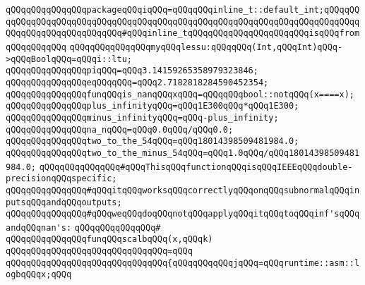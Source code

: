 \newline
\verb|qQQqqQQqqQQqqQQqpackageqQQqiqQQq=qQQqqQQqinline_t::default_int;qQQqqQQqqQQqqQQqqQQqqQQqqQQqqQQqqQQqqQQqqQQqqQQqqQQqqQQqqQQqqQQqqQQqqQQqqQQqqQQqqQQqqQQqqQQqqQQqqQQq#qQQqinline_tqQQqqQQqqQQqqQQqqQQqqQQqisqQQqfromqQQqqQQqqQQq|\newline
\newline
\verb|qQQqqQQqqQQqqQQqmyqQQqlessu:qQQqqQQq(Int,qQQqInt)qQQq->qQQqBoolqQQq=qQQqi::ltu;|\newline
\newline
\verb|qQQqqQQqqQQqqQQqpiqQQq=qQQq3.14159265358979323846;|\newline
\verb|qQQqqQQqqQQqqQQqeqQQqqQQq=qQQq2.7182818284590452354;|\newline
\newline
\verb|qQQqqQQqqQQqqQQqfunqQQqis_nanqQQqxqQQq=qQQqqQQqbool::notqQQq(x====x);|\newline
\newline
\verb|qQQqqQQqqQQqqQQqplus_infinityqQQq=qQQq1E300qQQq*qQQq1E300;|\newline
\verb|qQQqqQQqqQQqqQQqminus_infinityqQQq=qQQq-plus_infinity;|\newline
\newline
\verb|qQQqqQQqqQQqqQQqna_nqQQq=qQQq0.0qQQq/qQQq0.0;|\newline
\newline
\verb|qQQqqQQqqQQqqQQqtwo_to_the_54qQQq=qQQq18014398509481984.0;|\newline
\verb|qQQqqQQqqQQqqQQqtwo_to_the_minus_54qQQq=qQQq1.0qQQq/qQQq18014398509481984.0;|\newline
\newline
\verb|qQQqqQQqqQQqqQQq#qQQqThisqQQqfunctionqQQqisqQQqIEEEqQQqdouble-precisionqQQqspecific;|\newline
\verb|qQQqqQQqqQQqqQQq#qQQqitqQQqworksqQQqcorrectlyqQQqonqQQqsubnormalqQQqinputsqQQqandqQQqoutputs;|\newline
\verb|qQQqqQQqqQQqqQQq#qQQqweqQQqdoqQQqnotqQQqapplyqQQqitqQQqtoqQQqinf'sqQQqandqQQqnan's:|\newline
\verb|qQQqqQQqqQQqqQQq#|\newline
\verb|qQQqqQQqqQQqqQQqfunqQQqscalbqQQq(x,qQQqk)|\newline
\verb|qQQqqQQqqQQqqQQqqQQqqQQqqQQqqQQq=qQQq|\newline
\verb|qQQqqQQqqQQqqQQqqQQqqQQqqQQqqQQq{qQQqqQQqqQQqjqQQq=qQQqruntime::asm::logbqQQqx;qQQq|\newline
